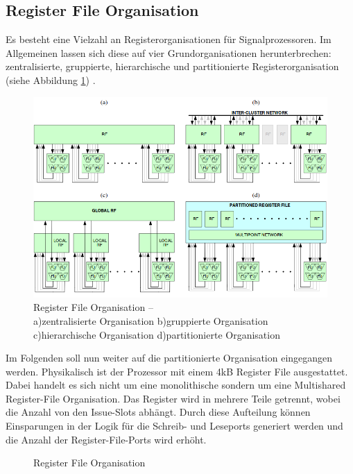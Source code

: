 \subsection{Register File Organisation}
\label{chap:register_orga}
Es besteht eine Vielzahl an Registerorganisationen für Signalprozessoren. Im Allgemeinen lassen sich diese auf vier Grundorganisationen herunterbrechen: zentralisierte, gruppierte, hierarchische und partitionierte Registerorganisation (siehe Abbildung \ref{fig:RegisterOrga}) \cite{paya2010multi}.\newline
\begin{figure}[htbp] 
	\centering
	\includegraphics[width=\textwidth]{fig/Register_orga.png}
	\caption[Register File Organisationstypen]{Register File Organisation –\\ a)zentralisierte Organisation b)gruppierte Organisation c)hierarchische Organisation d)partitionierte Organisation  \cite{paya2010multi}}
	\label{fig:RegisterOrga}
\end{figure}
\newline
Im Folgenden soll nun weiter auf die partitionierte Organisation eingegangen werden. Physikalisch ist der Prozessor mit einem 4kB Register File ausgestattet. Dabei handelt es sich nicht um eine monolithische sondern um eine Multishared Register-File Organisation. Das Register wird in mehrere Teile getrennt, wobei die Anzahl von den Issue-Slots abhängt. Durch diese Aufteilung können Einsparungen in der Logik für die Schreib- und Leseports generiert werden und die Anzahl der Register-File-Ports wird erhöht.\cite{paya2010multi}
\begin{scriptsize}
	\begin{figure}[htbp] 
		\centering
		
		\caption{Register File Organisation}
		\label{fig:reg_orga}
	\end{figure}
\end{scriptsize}

